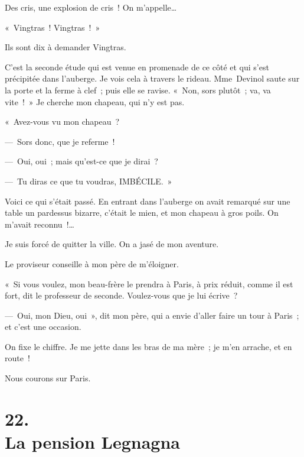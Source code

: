 \documentclass[french,twoside]{book} %
\def\mednobreak{\ifdim\lastskip<\medskipamount
  \removelastskip\nopagebreak\medskip\fi}
\newcommand{\labelblock}[1]{\medbreak{\noindent\color{rubric}\bfseries #1}\par\mednobreak}
\begin{document}
\noindent Des cris, une explosion de cris ! On m’appelle…\par
« Vingtras ! Vingtras ! »\par
Ils sont dix à demander Vingtras.\par
C’est la seconde étude qui est venue en promenade de ce côté et qui s’est précipitée dans l’auberge. Je vois cela à travers le rideau. Mme Devinol saute sur la porte et la ferme à clef ; puis elle se ravise. « Non, sors plutôt ; va, va vite ! » Je cherche mon chapeau, qui n’y est pas.\par
« Avez-vous vu mon chapeau ?\par
— Sors donc, que je referme !\par
— Oui, oui ; mais qu’est-ce que je dirai ?\par
— Tu diras ce que tu voudras, IMBÉCILE. »\par
\bigbreak
\noindent Voici ce qui s’était passé. En entrant dans l’auberge on avait remarqué sur une table un pardessus bizarre, c’était le mien, et mon chapeau à gros poils. On m’avait reconnu !…\par

\labelblock{ÉPILOGUE}

\noindent Je suis forcé de quitter la ville. On a jasé de mon aventure.\par
Le proviseur conseille à mon père de m’éloigner.\par
« Si vous voulez, mon beau-frère le prendra à Paris, à prix réduit, comme il est fort, dit le professeur de seconde. Voulez-vous que je lui écrive ?\par
— Oui, mon Dieu, oui », dit mon père, qui a envie d’aller faire un tour à Paris ; et c’est une occasion.\par
On fixe le chiffre. Je me jette dans les bras de ma mère ; je m’en arrache, et en route !\par
Nous courons sur Paris.
\section[{22. La pension Legnagna}]{22. \\
La pension Legnagna}\renewcommand{\leftmark}{22. \\
La pension Legnagna}
\end{document}
